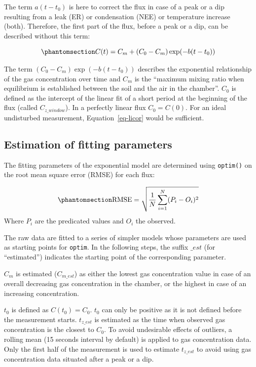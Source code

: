 \documentclass[
  letterpaper,
  DIV=11,
  numbers=noendperiod]{scrartcl}
\begin{document}
The term \(a(t - t_0)\) is here to correct the flux in case of a peak or
a dip resulting from a leak (ER) or condensation (NEE) or temperature
increase (both). Therefore, the first part of the flux, before a peak or
a dip, can be described without this term:

\begin{equation}\phantomsection\label{eq-licor}{
C(t)=C_m+(C_0 - C_m)\exp(-b(t-t_0))
}\end{equation}

The term \((C_0 - C_m)\exp(-b(t-t_0))\) describes the exponential
relationship of the gas concentration over time and \(C_m\) is the
``maximum mixing ratio when equilibrium is established between the soil
and the air in the chamber''. \(C_0\) is defined as the intercept of the
linear fit of a short period at the beginning of the flux (called
\(C_{z\_window}\)). In a perfectly linear flux \(C_0=C(0)\). For an
ideal undisturbed measurement, Equation~\ref{eq-licor} would be
sufficient.

\subsection{Estimation of fitting
parameters}\label{estimation-of-fitting-parameters}

The fitting parameters of the exponential model are determined using
\texttt{optim()} on the root mean square error (RMSE) for each flux:

\begin{equation}\phantomsection\label{eq-rmse}{
\text{RMSE}=\sqrt{\frac{1}{N}\sum_{i = 1}^N(P_i-O_i)^2}
}\end{equation} Where \(P_i\) are the predicated values and \(O_i\) the
observed.

The raw data are fitted to a series of simpler models whose parameters
are used as starting points for \texttt{optim}. In the following steps,
the suffix \(\_est\) (for ``estimated'') indicates the starting point of
the corresponding parameter.

\(C_m\) is estimated (\(C_{m\_est}\)) as either the lowest gas
concentration value in case of an overall decreasing gas concentration
in the chamber, or the highest in case of an increasing concentration.

\(t_0\) is defined as \(C(t_0) = C_0\). \(t_0\) can only be positive as
it is not defined before the measurement starts. \(t_{z\_est}\) is
estimated as the time when observed gas concentration is the closest to
\(C_0\). To avoid undesirable effects of outliers, a rolling mean (15
seconds interval by default) is applied to gas concentration data. Only
the first half of the measurement is used to estimate \(t_{z\_est}\) to
avoid using gas concentration data situated after a peak or a dip.
\end{document}
